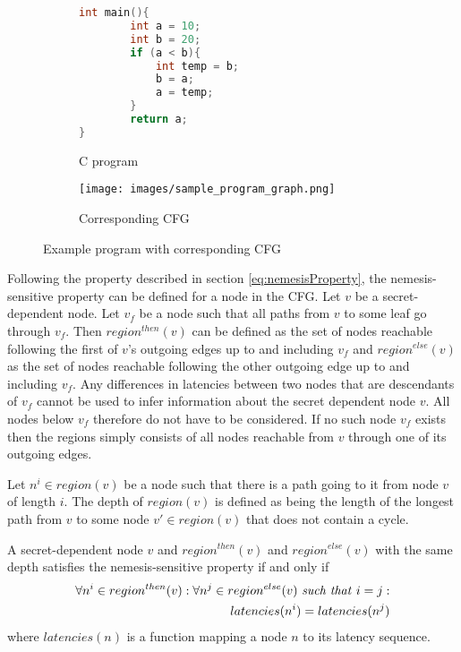 \begin{figure}
\centering
\begin{subfigure}{.4\textwidth}
  \centering
  
    \begin{lstlisting}[language=C]
int main(){
        int a = 10; 
        int b = 20; 
        if (a < b){
            int temp = b; 
            b = a; 
            a = temp; 
        } 
        return a;  
}\end{lstlisting}
  \caption{C program}
  \label{fig:c_program}
\end{subfigure}%
\begin{subfigure}{.7\textwidth}
  \centering
  \texttt{[image: images/sample\_program\_graph.png]}
  \caption{Corresponding CFG}
  \label{fig:c_program_cfg}
\end{subfigure}
\caption{Example program with corresponding CFG}
\label{fig:exampleCFG}
\end{figure}

Following the property described in section \ref{eq:nemesisProperty}, the nemesis-sensitive property can be defined for a node in the CFG. Let $v$ be a secret-dependent node. 
Let $v_f$ be a node such that all paths from $v$ to some leaf go through $v_f$. Then $region^{then}(v)$ can be defined as the set of nodes reachable following the 
first of $v$'s outgoing edges up to and including $v_f$ and $region^{else}(v)$ as the set of nodes reachable following the other outgoing edge up to and including $v_f$. Any differences in latencies between two nodes that are descendants of $v_f$ cannot be used to infer information about the secret dependent node $v$. All nodes below $v_f$ therefore do not have to be considered. If no such node $v_f$ exists then the regions simply consists of all nodes reachable from $v$ through one of its outgoing edges. 

Let $n^i \in region(v)$ be a node such that there is a path going to it from node $v$ of length $i$. The depth of $region(v)$ is defined as being the length of the longest path from $v$ to some node $v' \in region(v)$ that does not contain a cycle.

A secret-dependent node $v$ and $region^{then}(v)$ and $region^{else}(v)$ with the same depth satisfies the nemesis-sensitive property if and only if 
\begin{equation} \label{eq:nemesisPropertyNode}
    \begin{split}
    \forall n^i \in region^{then}(v) : \forall n^j \in region^{else}(v) \text{ \textit{such that} } i=j :  \\ 
    latencies(n^i) = latencies(n^j)
    \end{split}
\end{equation}
where $latencies(n)$ is a function mapping a node $n$ to its latency sequence. 

